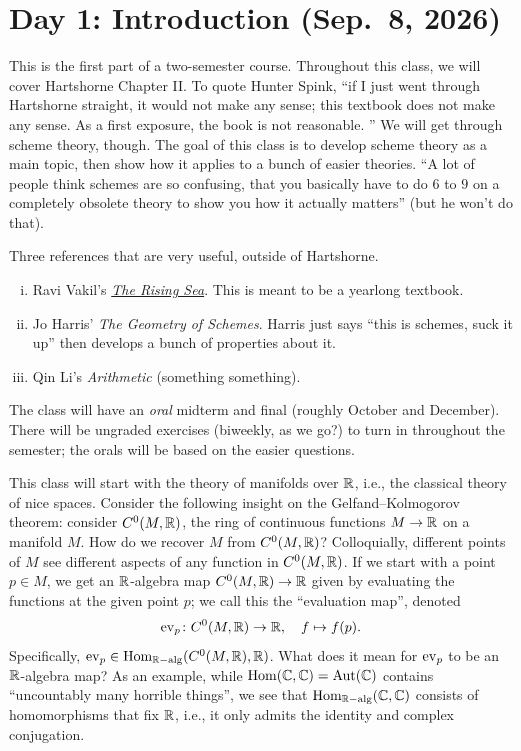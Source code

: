 \section{Day 1: Introduction (Sep.\ 8, 2026)}
This is the first part of a two-semester course. Throughout this class, we will cover Hartshorne Chapter II. To quote Hunter Spink, ``if I just went through Hartshorne straight, it would not make any sense; this textbook does not make any sense. As a first exposure, the book is not reasonable. '' We will get through scheme theory, though. The goal of this class is to develop scheme theory as a main topic, then show how it applies to a bunch of easier theories. ``A lot of people think schemes are so confusing, that you basically have to do $6$ to $9$ on a completely obsolete theory to show you how it actually matters'' (but he won't do that).

Three references that are very useful, outside of Hartshorne.
\begin{enumerate}[(i)]
    \item Ravi Vakil's \href{https://math.stanford.edu/~vakil/216blog/FOAGoct2125public.pdf}{\textit{The Rising Sea}}. This is meant to be a yearlong textbook.
    \item Jo Harris' \textit{The Geometry of Schemes}. Harris just says ``this is schemes, suck it up'' then develops a bunch of properties about it.
    \item Qin Li's \textit{Arithmetic} (something something).
\end{enumerate}

The class will have an \textit{oral} midterm and final (roughly October and December). There will be ungraded exercises (biweekly, as we go?) to turn in throughout the semester; the orals will be based on the easier questions.

This class will start with the theory of manifolds over $\mathbb R$, i.e., the classical theory of nice spaces. Consider the following insight on the Gelfand--Kolmogorov theorem: consider $C^0(M, \mathbb R)$, the ring of continuous functions $M \to \mathbb R$ on a manifold $M$. How do we recover $M$ from $C^0(M, \mathbb R)$? Colloquially, different points of $M$ see different aspects of any function in $C^0(M, \mathbb R)$. If we start with a point $p \in M$, we get an $\mathbb R$-algebra map $C^0(M, \mathbb R) \to \mathbb R$ given by evaluating the functions at the given point $p$; we call this the ``evaluation map'', denoted
\[ \operatorname{ev}_p \colon C^0(M, \mathbb R) \to \mathbb R, \quad f \mapsto f(p). \]
Specifically, $\operatorname{ev}_p \in \operatorname{Hom}_{\mathbb R\mathrm{-alg}}(C^0(M, \mathbb R), \mathbb R)$. What does it mean for $\operatorname{ev}_p$ to be an $\mathbb R$-algebra map? As an example, while $\operatorname{Hom}(\mathbb C, \mathbb C) = \operatorname{Aut}(\mathbb C)$ contains ``uncountably many horrible things'', we see that $\operatorname{Hom}_{\mathbb R\mathrm{-alg}}(\mathbb C, \mathbb C)$ consists of homomorphisms that fix $\mathbb R$, i.e., it only admits the identity and complex conjugation.

